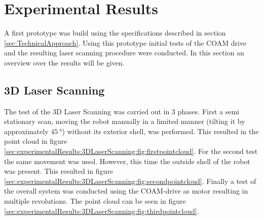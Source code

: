 \section{Experimental Results}
\label{sec:experimentalResults}

A first prototype was build using the specifications described in section \ref{sec:TechnicalApproach}. Using this prototype initial tests of the COAM drive and the resulting laser scanning procedure were conducted. In this section an overview over the results will be given.

\subsection{3D Laser Scanning}
\label{sec:experimentalResults:3DLaserScanning}

The test of the 3D Laser Scanning was carried out in 3 phases. First a semi stationary scan, moving the robot manually in a limited manner (tilting it by approximately $\SI{45}{\degree}$) without its exterior shell, was performed. This resulted in the point cloud in figure \ref{sec:experimentalResults:3DLaserScanning:fig:firstpointcloud}. For the second test the same movement was used. However, this time the outside shell of the robot  was present. This resulted in figure \ref{sec:experimentalResults:3DLaserScanning:fig:secondpointcloud}. Finally a test of the overall system was conducted using the COAM-drive as motor resulting in multiple revolutions. The point cloud can be seen in figure \ref{sec:experimentalResults:3DLaserScanning:fig:thirdpointcloud}.

